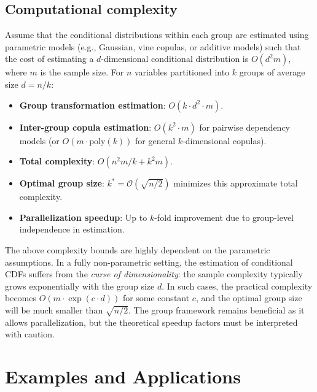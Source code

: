 \subsection{Computational complexity}
\begin{proposition}
\label{prop:complexity}
Assume that the conditional distributions within each group are estimated using parametric models (e.g., Gaussian, vine copulas, or additive models) such that the cost of estimating a $d$-dimensional conditional distribution is $O(d^2 m)$, where $m$ is the sample size. For $n$ variables partitioned into $k$ groups of average size $d = n/k$:
\begin{itemize}
    \item \textbf{Group transformation estimation}: $O(k \cdot d^2 \cdot m)$.
    \item \textbf{Inter-group copula estimation}: $O(k^2 \cdot m)$ for pairwise dependency models (or $O(m \cdot \text{poly}(k))$ for general $k$-dimensional copulas).
    \item \textbf{Total complexity}: $O(n^2 m / k + k^2 m)$.
    \item \textbf{Optimal group size}: $k^* = \mathcal{O}(\sqrt{n/2})$ minimizes this approximate total complexity.
    \item \textbf{Parallelization speedup}: Up to $k$-fold improvement due to group-level independence in estimation.
\end{itemize}

\begin{warning}
The above complexity bounds are highly dependent on the parametric assumptions. In a fully non-parametric setting, the estimation of conditional CDFs suffers from the \emph{curse of dimensionality}: the sample complexity typically grows exponentially with the group size $d$. In such cases, the practical complexity becomes $O(m \cdot \exp(c \cdot d))$ for some constant $c$, and the optimal group size will be much smaller than $\sqrt{n/2}$. The group framework remains beneficial as it allows parallelization, but the theoretical speedup factors must be interpreted with caution.
\end{warning}
\end{proposition}

\section{Examples and Applications}
